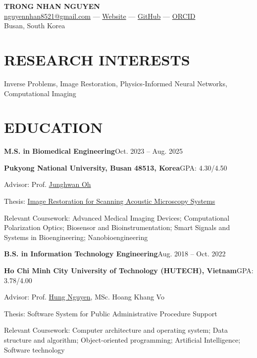 \documentclass[a4paper,10pt]{extarticle}
\newcommand{\cventry}[2]{\noindent\textbf{#1}\hfill #2\par}
\newcommand{\entrydetail}[1]{\noindent #1\par}
\newenvironment{cvlist}{\begin{list}{}{%
  \setlength{\leftmargin}{0pt}\setlength{\itemindent}{0pt}%
  \setlength{\parsep}{0pt}\setlength{\itemsep}{4pt}\setlength{\topsep}{4pt}}}%
  {\end{list}}
\begin{document}
\pagestyle{empty}

\begin{center}
    \textbf{\Large TRONG NHAN NGUYEN}\\[3pt]
    \href{mailto:nguyennhan8521@gmail.com}{nguyennhan8521@gmail.com} --- \href{https://nhannt69.github.io}{Website} --- \href{https://github.com/nhannt69}{GitHub} --- \href{https://orcid.org/0009-0005-5281-0261}{ORCID}\\
    Busan, South Korea
\end{center}

\section*{RESEARCH INTERESTS}
\noindent Inverse Problems, Image Restoration, Physics-Informed Neural Networks, Computational Imaging

\section*{EDUCATION}
\begin{cvlist}
    \item
    \cventry{M.S. in Biomedical Engineering}{Oct. 2023 -- Aug. 2025}
    \cventry{Pukyong National University, Busan 48513, Korea}{GPA: 4.30/4.50}
    \entrydetail{Advisor: Prof. \href{https://scholar.google.com/citations?user=HnYb_PEAAAAJ\&hl=ko}{Junghwan Oh}}
    \entrydetail{Thesis: \href{https://repository.pknu.ac.kr:8443/handle/2021.oak/34334}{Image Restoration for Scanning Acoustic Microscopy Systems}}
    \entrydetail{Relevant Coursework: Advanced Medical Imaging Devices; Computational Polarization Optics; Biosensor and Bioinstrumentation; Smart Signals and Systems in Bioengineering; Nanobioengineering}

    \item
    \cventry{B.S. in Information Technology Engineering}{Aug. 2018 -- Oct. 2022}
    \cventry{Ho Chi Minh City University of Technology (HUTECH), Vietnam}{GPA: 3.78/4.00}
    \entrydetail{Advisor: Prof. \href{https://scholar.google.com/citations?user=RA6VhUQAAAAJ}{Hung Nguyen}, MSc. Hoang Khang Vo}
    \entrydetail{Thesis: Software System for Public Administrative Procedure Support}
    \entrydetail{Relevant Coursework: Computer architecture and operating system; Data structure and algorithm; Object-oriented programming; Artificial Intelligence; Software technology}
\end{cvlist}
\end{document}
